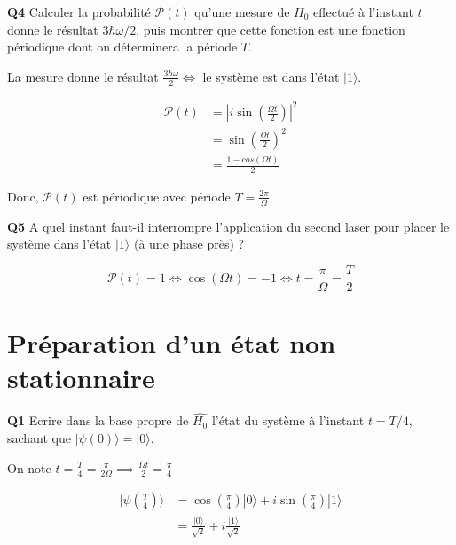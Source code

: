 \documentclass[french]{article}
\begin{document}
	\begin{tcolorbox}[colback=gray!5!white,colframe=gray!75!black]
		\textbf{\large{Q4}} Calculer la probabilité $\mathcal{P}(t)$ qu'une mesure de $H_0$ effectué à l'instant $t$ donne le résultat $3\hbar \omega /2$, puis montrer que cette fonction est une fonction périodique dont on déterminera la période $T$. 
	\end{tcolorbox}

	La mesure donne le résultat $\frac{3\hbar \omega}{2} \iff$ le système est dans l'état $|1\rangle$.
	
	\begin{align}
		\mathcal{P}(t) &= \left|i \sin\left(\frac{\Omega t}{2}\right)\right|^2\\
		&= \sin\left(\frac{\Omega t}{2}\right)^2\\
		&= \frac{1 - cos\left(\Omega t\right)}{2}
	\end{align}
	
	Donc, $\mathcal{P}(t)$ est périodique avec période $T = \frac{2\pi}{\Omega}$

	\begin{tcolorbox}[colback=gray!5!white,colframe=gray!75!black]
		\textbf{\large{Q5}} A quel instant faut-il interrompre l'application du second laser pour placer le système dans l'état $|1\rangle$ (à une phase près) ? 
	\end{tcolorbox}

	\[\mathcal{P}(t) = 1 \iff \cos(\Omega t) = -1 \iff t = \frac{\pi}{\Omega} = \frac{T}{2}\]

	\section{Préparation d'un état non stationnaire}

	\begin{tcolorbox}[colback=gray!5!white,colframe=gray!75!black]
		\textbf{\large{Q1}} Ecrire dans la base propre de $\hat{H_0}$ l'état du système à l'instant $t = T/4$, sachant que $|\psi(0)\rangle = |0\rangle$.
	\end{tcolorbox}

	On note $t = \frac{T}{4} = \frac{\pi}{2\Omega} \implies \frac{\Omega t}{2} = \frac{\pi}{4}$

	\begin{align}
	|\psi(\frac{T}{4})\rangle &= \cos\left(\frac{\pi}{4}\right)|0\rangle + i \sin\left(\frac{\pi}{4}\right)|1\rangle\\
	&= \frac{|0\rangle}{\sqrt{2}} + i \frac{|1\rangle}{\sqrt{2}}
	\end{align}
\end{document}
